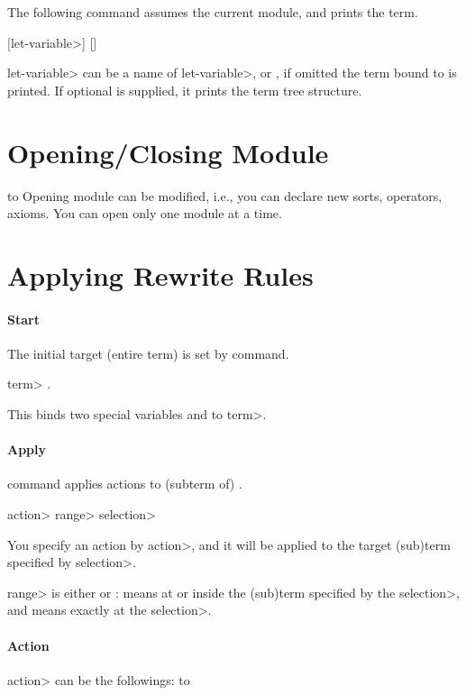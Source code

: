 The following  command assumes the current module, and
prints the term.

 [\<let-variable>] []

\<let-variable> can be a name of \<let-variable>,  or
, if omitted the term bound to  is
printed.  If optional  is supplied, it prints the term tree 
structure. 

\section{Opening/Closing Module}

\paralign to 
Opening module can be modified, i.e., you can declare new sorts,
operators, axioms. You can open only one module at a time.

\section{Applying Rewrite Rules}

\paragraph{Start}
The initial target (entire term) is set by  command.

 \<term> .

This binds two special variables  and
 to \<term>. 

\paragraph{Apply}
 command applies actions to (subterm of) .

 \<action> \<range> \<selection>

You specify an action by \<action>, and it will be applied to the
target (sub)term specified by \<selection>. 

\<range> is either  or :  means at or
inside the  (sub)term specified by the \<selection>, and 
means exactly at the \<selection>.

\paragraph{Action}
\<action> can be the followings:
\paralign to 

